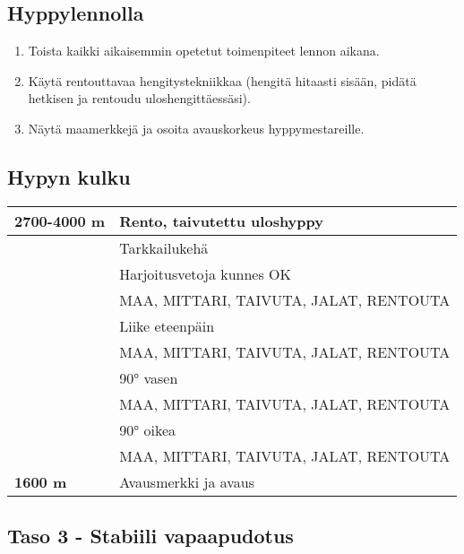 \begin{multicols}{2}
\subsection{ Hyppylennolla }
\label{nova-alkeiskoulutuksen-suoritukset-hyppylennolla}

\begin{enumerate}[label=\bfseries \arabic*)]
\item  Toista kaikki aikaisemmin opetetut toimenpiteet lennon aikana. 
\item  Käytä rentouttavaa hengitystekniikkaa (hengitä hitaasti sisään, pidätä hetkisen ja rentoudu uloshengittäessäsi). 
\item  Näytä maamerkkejä ja osoita avauskorkeus hyppymestareille. 
\end{enumerate}
\subsection{ Hypyn kulku }
\label{nova-alkeiskoulutuksen-suoritukset-hypyn-kulku}

\begin{tabular}[]{|l|p{4.7cm}|}
\hline
 \textbf{2700-4000 m} &  Rento, taivutettu uloshyppy
\\ \hline
  &  Tarkkailukehä
\\ \hline
  &  Harjoitusvetoja kunnes OK
\\ \hline
  &  MAA, MITTARI, TAIVUTA, JALAT, RENTOUTA
\\ \hline
  &  Liike eteenpäin
\\ \hline
  &  MAA, MITTARI, TAIVUTA, JALAT, RENTOUTA
\\ \hline
  &  90° vasen
\\ \hline
  &  MAA, MITTARI, TAIVUTA, JALAT, RENTOUTA
\\ \hline
  &  90° oikea
\\ \hline
  &  MAA, MITTARI, TAIVUTA, JALAT, RENTOUTA
\\ \hline
 \textbf{1600 m} &  Avausmerkki ja avaus
\\ \hline
\end{tabular}

\end{multicols}\pagebreak\begin{multicols}{2} 

\section{ Taso 3 - Stabiili vapaapudotus }
\label{nova-alkeiskoulutuksen-suoritukset-taso-3-stabiili-vapaapudotus}



\end{multicols}
